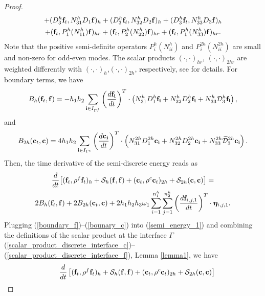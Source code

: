 \begin{proof}
\begin{multline*}
+  ({D}_3^{h}{\bf f}_t,{N}_{31}^{h}{D}_1{\bf f})_{h} 
+  ({D}_3^{h}{\bf f}_t,{N}_{32}^{h}{D}_2{\bf f})_{h} +  ({D}_3^{h}{\bf f}_t,{N}_{33}^{h}{D}_3{\bf f})_{h}\\
+ ({\bf f}_t, P^{h}_1(N_{11}^h){\bf f})_{hr} + ({\bf f}_t, P^{h}_2(N_{22}^h){\bf f})_{hr} + ({\bf f}_t, P^{h}_1(N_{33}^h){\bf f})_{hr}.
\end{multline*}
Note that the positive semi-definite operators $P_i^{h}(N_{ii}^{h})$ and $P_i^{2h}(N_{ii}^{2h})$ are small and non-zero for odd-even modes. The scalar products $(\cdot, \cdot)_{hr}$, $(\cdot,\cdot)_{2hr}$ are weighted differently with $(\cdot, \cdot)_h$,$(\cdot, \cdot)_{2h}$, respectively, see \cite{sjogreen2012fourth, petersson2015wave} for details. For boundary terms, we have
\begin{equation}\label{boundary_f}
B_h ({\bf f}_t,{\bf f}) = -h_1h_2\sum_{{\bf i}\in I_{\Gamma^f}}\left(\frac{d{\bf f}_{\bf i}}{dt}\right)^T\cdot\left({N}_{31}^h{D}_1^h {\bf f}_{\bf i}+ {N}_{32}^h{D}_2^h{\bf f}_{\bf i}+{N}_{33}^h\mathcal{D}_3^h{\bf f}_{\bf i}\right),
\end{equation}
and 
\begin{equation}\label{bounary_c}
B_{2h} ({\bf c}_t,{\bf c}) = 4h_1h_2\sum_{{\bf i}\in I_{\Gamma^c}}\left(\frac{d{\bf c}_{\bf i}}{dt}\right)^T\cdot\left({N}_{31}^{2h}{D}_1^{2h}{\bf c}_{\bf i}+{N}_{32}^{2h}{D}_2^{2h}{\bf c}_{\bf i}+{N}_{33}^{2h}\wt{\mathcal{D}}_3^{2h}{\bf c}_{\bf i}\right).
\end{equation}
Then, the time derivative of the semi-discrete energy reads as
\begin{multline}\label{semi_energy_1}
\frac{d}{dt}\big[({\bf f}_t,\rho^f {\bf f}_t)_h + \mathcal{S}_{h}({\bf f},{\bf f}) + ({\bf c}_t,\rho^{c} {\bf c}_t)_{2h} + \mathcal{S}_{2h}({\bf c},{\bf c}) \big]  = \\
2B_{h}({\bf f}_t,{\bf f}) + 2B_{2h}({\bf c}_t,{\bf c}) + 2h_1h_2h_3\omega_1\sum_{i = 1}^{n_1^h}\sum_{j=1}^{n_2^h}\left(\frac{d{\bf f}_{i,j,1}}{dt}\right)^T\cdot{\bm \eta}_{i,j,1}.
\end{multline}
Plugging (\ref{boundary_f})--(\ref{bounary_c}) into (\ref{semi_energy_1}) and combining the definitions of the scalar product at the interface $\Gamma$ (\ref{scalar_product_discrete_interface_c})--(\ref{scalar_product_discrete_interface_f}), Lemma \ref{lemma1}, we have
\begin{align*}\label{semi_energy_2}
&\hspace{0.4cm}\frac{d}{dt}\left[({\bf f}_t,\rho^f {\bf f}_t)_{h} + \mathcal{S}_{h}({\bf f},{\bf f}) + ({\bf c}_t,\rho^{c} {\bf c}_t)_{2h} + \mathcal{S}_{2h}({\bf c},{\bf c}) \right]   \nonumber\\

\end{align*}
\end{proof}
